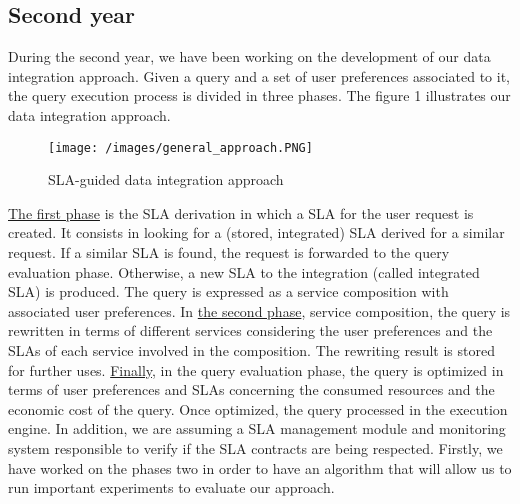 \subsection{Second year}

During the second year, we have been working on the development of our data integration approach. Given a query and a set of user preferences associated to it, the query execution process is divided in three phases. The figure 1 illustrates our data integration approach.

\begin{figure}[h!]
\center
\texttt{[image: /images/general\_approach.PNG]} 
\caption{SLA-guided data integration approach}
\end{figure}

\underline{The first phase} is the SLA derivation in which a SLA for the user request is created. It consists in looking for a (stored, integrated) SLA derived for a similar request. If a similar SLA is found, the request is forwarded to the query evaluation phase. Otherwise, a new SLA to the integration (called integrated SLA) is produced. The query is expressed as a service composition with associated user preferences. In \underline{the second phase}, service composition, the query is rewritten in terms of different services considering the user preferences and the SLAs of each service involved in the composition. The rewriting result is stored for further uses. \underline{Finally}, in the query evaluation phase, the query is optimized in terms of user preferences and SLAs concerning the consumed resources and the economic cost of the query. Once optimized, the query processed in the execution engine. In addition, we are assuming a SLA management module and monitoring system responsible to verify if the SLA contracts are being respected. Firstly, we have worked on the phases two in order to have an algorithm that will allow us to run important experiments to evaluate our approach. 
	
